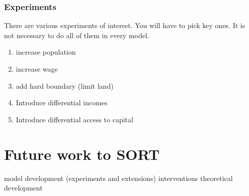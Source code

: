 \subsection{Experiments}
There are various experiments of interest. You will have to pick key ones. It is not necessary to do all of them in every model. 

	\begin{enumerate}
		\item increase population
		\item increase wage
		\item add hard boundary (limit land)
		\item Introduce differential incomes
		\item Introduce differential access to capital
	\end{enumerate}



\chapter{Future work to SORT}
model development (experiments and extensions)
interventions
theoretical development

